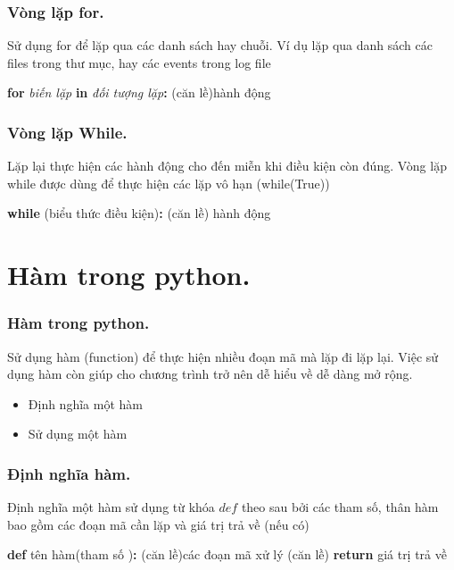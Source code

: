 \documentclass{beamer}
\begin{document}
\begin{frame}[label=vongfor]
\frametitle{Vòng lặp for.}

Sử dụng for để lặp qua các danh sách hay chuỗi. Ví dụ lặp qua danh sách các files trong thư mục, hay các events trong log file

\begin{example}
\textbf{for} \textit{biến lặp} \textbf{in} \textit{đối tượng lặp}\textbf{:}\newline
(căn lề)hành động
\end{example}

\hyperlink{vonglap}{}
\end{frame}

\begin{frame}[label=vongwhile]
\frametitle{Vòng lặp While.}

Lặp lại thực hiện các hành động cho đến miễn khi điều kiện còn đúng. Vòng lặp while được dùng để thực hiện các lặp vô hạn (while(True))

\begin{example}
\textbf{while} (biểu thức điều kiện)\textbf{:} \newline
(căn lề) hành động
\end{example}

\hyperlink{vonglap}{}
\end{frame}

\section{Hàm trong python.}
\begin{frame}[label=ham]
\frametitle{Hàm trong python.}

Sử dụng hàm (function) để thực hiện nhiều đoạn mã mà lặp đi lặp lại. Việc sử dụng hàm còn giúp cho chương trình trở nên dễ hiểu về dễ dàng mở rộng.
\begin{itemize}
\item Định nghĩa một hàm \hyperlink{dinhnghiaham}{\beamerbutton{$\unrhd$}}
\item Sử dụng một hàm  \hyperlink{goiham}{\beamerbutton{$\unrhd$}}

\end{itemize}
\hyperlink{intro}{}
\hyperlink{goithuvien}{}
\end{frame}

\begin{frame}[label=dinhnghiaham]
\frametitle{Định nghĩa hàm.}

Định nghĩa một hàm sử dụng từ khóa $def$ theo sau bởi các tham số, thân hàm bao gồm các đoạn mã cần lặp và giá trị trả về (nếu có)

\begin{example}
\textbf{def} tên hàm(tham số )\textbf{:}\newline
(căn lề)các đoạn mã xử lý \newline
(căn lề) \textbf{return} giá trị trả về
\end{example}
\hyperlink{ham}{}
\end{frame}
\end{document}
